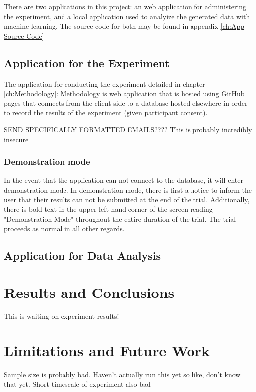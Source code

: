 \documentclass[12pt]{report}
\begin{document}
There are two applications in this project: an web application for administering the experiment, and a local application used to analyize the generated data with machine learning. The source code for both may be found in appendix \ref{ch:App Source Code}

\section{Application for the Experiment}

The application for conducting the experiment detailed in chapter \ref{ch:Methodology}: Methodology is web application that is hosted using GitHub pages that connects from the client-side to a database hosted elsewhere in order to record the results of the experiment (given participant consent).

SEND SPECIFICALLY FORMATTED EMAILS???? This is probably incredibly insecure

\subsection{Demonstration mode}

In the event that the application can not connect to the database, it will enter demonstration mode. In demonstration mode, there is first a notice to inform the user that their results can not be submitted at the end of the trial. Additionally, there is bold text in the upper left hand corner of the screen reading "Demonstration Mode" throughout the entire duration of the trial. The trial proceeds as normal in all other regards.

\section{Application for Data Analysis}

\chapter{Results and Conclusions}

This is waiting on experiment results!

\chapter{Limitations and Future Work}

Sample size is probably bad. Haven't actually run this yet so like, don't know that yet. Short timescale of experiment also bad
\end{document}
